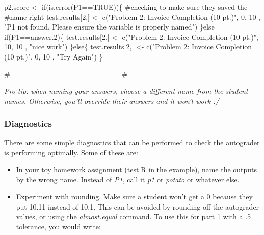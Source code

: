 \documentclass[
]{article}
\newenvironment{Shaded}{}{}
\newcommand{\CommentTok}[1]{\textcolor[rgb]{0.00,0.50,0.00}{#1}}
\newcommand{\ControlFlowTok}[1]{\textcolor[rgb]{0.00,0.00,1.00}{#1}}
\newcommand{\DecValTok}[1]{#1}
\newcommand{\FloatTok}[1]{#1}
\newcommand{\KeywordTok}[1]{\textcolor[rgb]{0.00,0.00,1.00}{#1}}
\newcommand{\NormalTok}[1]{#1}
\newcommand{\OperatorTok}[1]{#1}
\newcommand{\OtherTok}[1]{\textcolor[rgb]{1.00,0.25,0.00}{#1}}
\newcommand{\StringTok}[1]{\textcolor[rgb]{0.00,0.50,0.50}{#1}}
\begin{document}
\begin{Shaded}
\begin{Highlighting}[numbers=left,,]
\NormalTok{    p2.score <-}\StringTok{ }\ControlFlowTok{if}\NormalTok{(}\KeywordTok{is.error}\NormalTok{(P1}\OperatorTok{==}\OtherTok{TRUE}\NormalTok{))\{ }\CommentTok{#checking to make sure they saved the}
    \CommentTok{#name right}
\NormalTok{        test.results[}\DecValTok{2}\NormalTok{,] <-}\StringTok{ }\KeywordTok{c}\NormalTok{(}\StringTok{"Problem 2: Invoice Completion (10 pt.)"}\NormalTok{,}
                              \DecValTok{0}\NormalTok{,}
                              \DecValTok{10}\NormalTok{ ,}
                              \StringTok{"P1 not found. Please ensure the }
\StringTok{                              variable is properly named"}\NormalTok{)}
\NormalTok{    \}}\ControlFlowTok{else} \ControlFlowTok{if}\NormalTok{(P1}\OperatorTok{==}\NormalTok{answer}\FloatTok{.2}\NormalTok{)\{}
\NormalTok{        test.results[}\DecValTok{2}\NormalTok{,] <-}\StringTok{ }\KeywordTok{c}\NormalTok{(}\StringTok{"Problem 2: Invoice Completion (10 pt.)"}\NormalTok{,}
                              \DecValTok{10}\NormalTok{,}
                              \DecValTok{10}\NormalTok{ ,}
                              \StringTok{"nice work"}\NormalTok{)}
\NormalTok{    \}}\ControlFlowTok{else}\NormalTok{\{}
\NormalTok{        test.results[}\DecValTok{2}\NormalTok{,] <-}\StringTok{ }\KeywordTok{c}\NormalTok{(}\StringTok{"Problem 2: Invoice Completion (10 pt.)"}\NormalTok{,}
                              \DecValTok{0}\NormalTok{,}
                              \DecValTok{10}\NormalTok{ ,}
                              \StringTok{"Try Again"}\NormalTok{)}
\NormalTok{    \}}
    
    \CommentTok{# --------------------------------------------- #}
\end{Highlighting}
\end{Shaded}

\emph{Pro tip: when naming your answers, choose a different name from
the student names. Otherwise, you'll override their answers and it won't
work :/}

\hypertarget{diagnostics}{%
\subsubsection{Diagnostics}\label{diagnostics}}

There are some simple diagnostics that can be performed to check the
autograder is performing optimally. Some of these are:

\begin{itemize}
\item
  In your toy homework assignment (test.R in the example), name the
  outputs by the wrong name. Instead of \emph{P1}, call it \emph{p1} or
  \emph{potato} or whatever else.
\item
  Experiment with rounding. Make sure a student won't get a 0 because
  they put 10.11 instead of 10.1. This can be avoided by rounding off
  the autograder values, or using the \emph{almost.equal} command. To
  use this for part 1 with a .5 tolerance, you would write:
\end{itemize}
\end{document}
